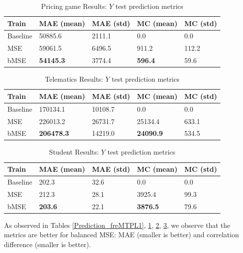 \documentclass{article}
\theoremstyle{definition}
\begin{document}
\begin{table}[h!]
\centering
\begin{tabular}{|p{1.5cm}||p{1cm}|p{1cm}||p{1cm}|p{1cm}|} 
\hline
Train & MAE (mean) & MAE (std) & MC (mean) & MC (std)\\ [0.5ex] 
\hline\hline
Baseline &50885.6 & 2111.1	 &  0.0 & 0.0  \\ 
\hline
MSE & 59061.5 & 6496.5	  & 911.2	 &112.2	\\
\hline
bMSE & \textbf{54145.3} & 3774.4   &  \textbf{596.4	} & 59.6 \\
\hline
\end{tabular}
\caption{Pricing game Results: $Y$ test prediction metrics}
     \label{Prediction_PricingGame1}
\end{table}

\begin{table}[h!]
\centering
\begin{tabular}{|p{1.5cm}||p{1cm}|p{1cm}||p{1cm}|p{1cm}|} 
\hline
Train & MAE (mean) & MAE (std) & MC (mean) & MC (std)\\ [0.5ex] 
\hline\hline
Baseline & 170134.1  & 10108.7 &  0.0 & 0.0  \\ 
\hline
MSE & 226013.2  & 26731.7  & 25134.4 & 633.1 \\
\hline
bMSE &  \textbf{206478.3} & 14219.0  & \textbf{24090.9} & 534.5\\
\hline
\end{tabular}
\caption{Telematics Results: $Y$ test prediction metrics}
     \label{Prediction_Telematics1}
\end{table}

\begin{table}[h!]
\centering
\begin{tabular}{|p{1.5cm}||p{1cm}|p{1cm}||p{1cm}|p{1cm}|} 
\hline
Train & MAE (mean) & MAE (std) & MC (mean) & MC (std)\\ [0.5ex] 
\hline\hline
Baseline &  202.3 & 32.6 &  0.0 & 0.0  \\ 
\hline
MSE &  212.3 & 28.1  & 3925.4 & 99.3 \\
\hline
bMSE &  \textbf{203.6} & 22.1  & \textbf{3876.5} & 79.6\\
\hline
\end{tabular}
\caption{Student Results: $Y$ test prediction metrics}
     \label{Prediction_Student1}
\end{table}


As observed in Tables \ref{Prediction_freMTPL1}, \ref{Prediction_PricingGame1}, \ref{Prediction_Telematics1}, \ref{Prediction_Student1}, we observe that the metrics are better for balanced MSE: MAE (smaller is better) and correlation difference (smaller is better).
\end{document}
